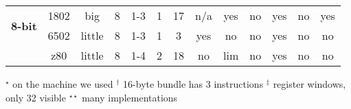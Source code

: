 \begin{sidewaystable}[tbp]
\begin{sf}
\begin{footnotesize}
\begin{center}
\begin{tabular}{|c|c||c|c|c|c|c|c|c|c|c|c|c|}
\hline
\hline



\multirow{2}{*}{\bf 8-bit} &
1802		& %
big		& %
8		& %
1-3		& %
1		& %
17		& %
n/a		& %
yes		& %
no		& %
yes		& %
no		& %
yes		%
\\
\cline{2-13}

		 & %
6502             & %
little           & %
8                & %
1-3              & %
1                & %
3                & %
yes              & %
no               & %
no               & %
yes              & %
no               & %
no                 %
\\
\cline{2-13}


                 & %
z80              & %
little           & %
8                & %
1-4              & %
2                & %
18               & %
no               & %
lim              & %
no 		 & %
yes              & %
no               & %
no                 %
\\
\cline{2-13}

\hline

\end{tabular}

$^{\star}$ on the machine we used \hspace{2em}$^{\dagger}$ 16-byte bundle has 3 instructions
\hspace{3em}$^{\ddagger}$ register windows, only 32 visible
\hspace{2em}$^{\star\star}$ many implementations
\end{center}
\end{footnotesize}
\end{sf}
\end{sidewaystable}
